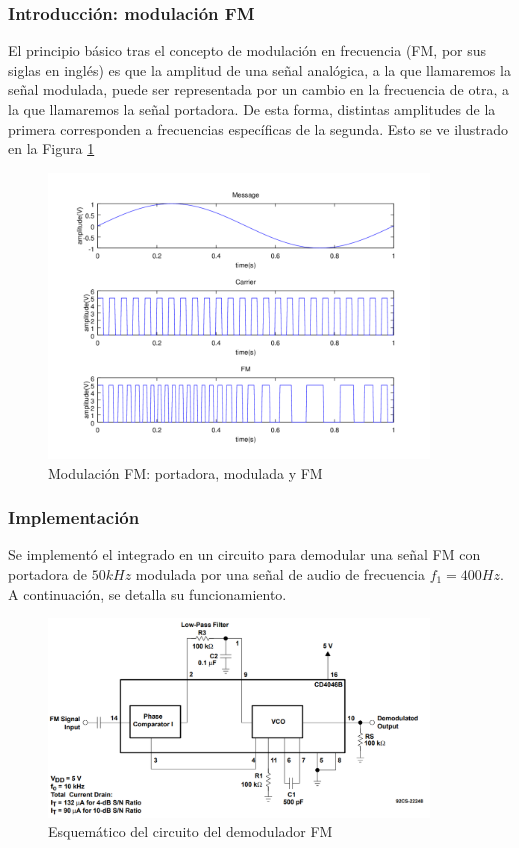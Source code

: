 \subsubsection{Introducción: modulación FM}
El principio básico tras el concepto de modulación en frecuencia (FM, por sus siglas en inglés) es que la amplitud de una señal analógica, a la que llamaremos la señal modulada, puede ser representada por un cambio en la frecuencia de otra, a la que llamaremos la señal portadora. De esta forma, distintas amplitudes de la primera corresponden a frecuencias específicas de la segunda. Esto se ve ilustrado en la Figura \ref{modulacionfmsenales}
\begin{figure}[H]
    \centering
    \includegraphics[width=0.9\textwidth]{resources/modulacionfmsenales.png}
    \caption{Modulación FM: portadora, modulada y FM}
    \label{modulacionfmsenales}
\end{figure}

\subsubsection{Implementación}
Se implementó el integrado en un circuito para demodular una señal FM con portadora de $50kHz$ modulada por una señal de audio de frecuencia $f_{1}=400Hz$. A continuación, se detalla su funcionamiento.
\begin{figure}[H]
    \centering
    \includegraphics[width=0.9\textwidth]{resources/demoduladorfmconexion.png}
    \caption{Esquemático del circuito del demodulador FM}
    \label{demoduladorfmconexion}
\end{figure}

